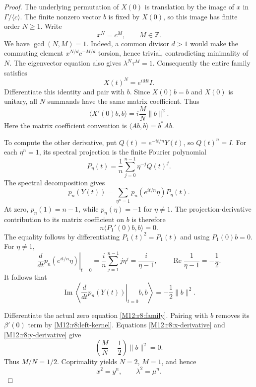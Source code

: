 \documentclass[11pt,a4paper,oneside]{report}
\theoremstyle{definition}
\theoremstyle{remark}
\newcommand{\Z}{\mathbb Z}
\begin{document}
\begin{proof}
The underlying permutation of $X(0)$ is translation by the image
of $x$ in $\Gamma/\langle c\rangle$. The finite nonzero vector
$b$ is fixed by $X(0)$, so this image has finite order $N\ge1$.
Write
\begin{equation}\label{M12:r8:root-order}
 x^N=c^M,\qquad M\in\Z.
\end{equation}
We have $\gcd(N,M)=1$. Indeed, a common divisor $d>1$ would make
the commuting element $x^{N/d}c^{-M/d}$ torsion, hence trivial,
contradicting minimality of $N$.
The eigenvector equation also gives $\lambda^N\tau^M=1$.
Consequently the entire family satisfies
\[
 X(t)^N=e^{iMt}I.
\]
Differentiate this identity and pair with $b$. Since $X(0)b=b$
and $X(0)$ is unitary, all $N$ summands have the same matrix
coefficient. Thus
\begin{equation}\label{M12:r8:x-derivative}
 \langle X'(0)b,b\rangle=i\frac{M}{N}\|b\|^2.
\end{equation}
Here the matrix coefficient convention is
$\langle Ab,b\rangle=b^*Ab$.

To compute the other derivative, put $Q(t)=e^{-it/n}Y(t)$,
so $Q(t)^n=I$. For each $\eta^n=1$, its spectral projection is
the finite Fourier polynomial
\[
 P_\eta(t)=\frac1n\sum_{j=0}^{n-1}\eta^{-j}Q(t)^j.
\]
The spectral decomposition gives
\[
 p_n(Y(t))=\sum_{\eta^n=1}p_n(e^{it/n}\eta)P_\eta(t).
\]
At zero, $p_n(1)=n-1$, while $p_n(\eta)=-1$ for $\eta\ne1$.
The projection-derivative contribution to its matrix coefficient
on $b$ is therefore
\[
 n\langle P_1'(0)b,b\rangle=0.
\]
The equality follows by differentiating $P_1(t)^2=P_1(t)$ and
using $P_1(0)b=0$. For $\eta\ne1$,
\[
 \left.\frac{d}{dt}p_n(e^{it/n}\eta)\right|_{t=0}
 =\frac{i}{n}\sum_{j=1}^{n-1}j\eta^j
 =\frac{i}{\eta-1},\qquad
 \operatorname{Re}\frac1{\eta-1}=-\frac12.
\]
It follows that
\begin{equation}\label{M12:r8:y-derivative}
 \operatorname{Im}
 \left\langle\left.\frac{d}{dt}p_n(Y(t))\right|_{t=0}b,b\right\rangle
 =-\frac12\|b\|^2.
\end{equation}

Differentiate the actual zero equation \eqref{M12:r8:family}.
Pairing with $b$ removes its $\beta'(0)$ term by
\eqref{M12:r8:left-kernel}. Equations \eqref{M12:r8:x-derivative} and
\eqref{M12:r8:y-derivative} give
\[
 \left(\frac{M}{N}-\frac12\right)\|b\|^2=0.
\]
Thus $M/N=1/2$. Coprimality yields $N=2$, $M=1$, and hence
\begin{equation}\label{M12:r8:forced-resonance}
 x^2=y^n,\qquad \lambda^2=\mu^n.
\end{equation}


\end{proof}
\end{document}
